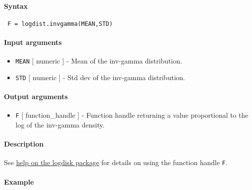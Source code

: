 


	\paragraph{Syntax}
 
 \begin{verbatim}
 F = logdist.invgamma(MEAN,STD)
 \end{verbatim}
 
 \paragraph{Input arguments}
 
 \begin{itemize}
 \item
   \texttt{MEAN} {[} numeric {]} - Mean of the inv-gamma distribution.
 \item
   \texttt{STD} {[} numeric {]} - Std dev of the inv-gamma distribution.
 \end{itemize}
 
 \paragraph{Output arguments}
 
 \begin{itemize}
 \item
   \texttt{F} {[} function\_handle {]} - Function handle returning a
   value proportional to the log of the inv-gamma density.
 \end{itemize}
 
 \paragraph{Description}
 
 See \href{logdist/Contents}{help on the logdisk package} for details on
 using the function handle \texttt{F}.
 
 \paragraph{Example}


